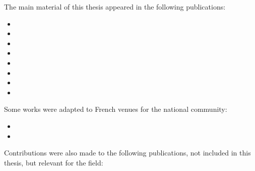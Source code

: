 
\noindent
The main material of this thesis appeared in the following publications:

{\footnotesize
{}
\begin{itemize}
    \item {}
    \item {}
    \item {}
    \item {}
    \item {}
    \item {}
    \item {}
    \item {}
\end{itemize}}
\vspace*{1em}

\noindent
Some works were adapted to French venues for the national community: 

{\footnotesize
{}
\begin{itemize}
    \item {}
    \item {}
\end{itemize}}
\vspace*{1em}

\noindent
Contributions were also made to the following publications, not included in this thesis, but relevant for the field:

